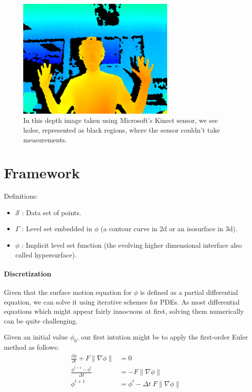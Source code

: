 \documentclass{article}
\begin{document}
\begin{figure}
  \centering
  \includegraphics[width=0.7\textwidth]{img/depthmap.png}
  \caption{In this depth image taken using Microsoft's Kinect sensor, we see
holes, represented as black regions, where the sensor couldn't take
measurements.}

\end{figure}


\section{Framework}

Definitions:
\begin{itemize}
\item $\mathcal{S}$ : Data set of points.
\item $\Gamma$ : Level set embedded in $\phi$ (a contour curve in 2d or an
    isosurface in 3d).
\item $\phi$ : Implicit level set function (the evolving higher dimensional
    interface also called hypersurface).
\end{itemize}

\paragraph{Discretization}

Given that the surface motion equation for $\phi$ is defined as a partial
differential equation, we can solve it using iterative schemes for PDEs. As most
differential equations which might appear fairly innocuous at first, solving
them numerically can be quite challenging.

Given an initial value $\phi_0$, our first intution might be to apply the
first-order Euler method as follows:
\begin{align}
  \frac{\partial \phi}{\partial t} + F \|\nabla \phi\| &= 0 \\
  \frac{\phi^{t+1} - \phi^{t}}{\Delta t} &=  -F \|\nabla \phi\| \\
  \phi^{t+1} &= \phi^{t} - \Delta t \; F \|\nabla \phi\| 
\end{align}
\end{document}
